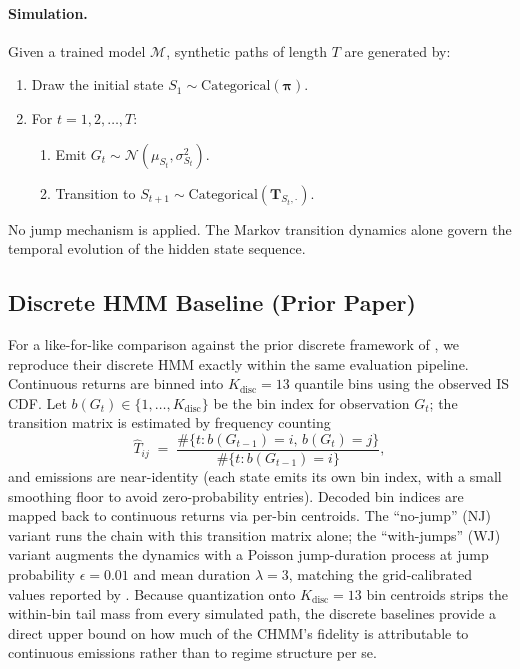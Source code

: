 \paragraph{Simulation.}
Given a trained model $\mathcal{M}$, synthetic paths of length $T$ are generated by:
\begin{enumerate}
    \item Draw the initial state $S_1 \sim \text{Categorical}(\boldsymbol{\pi})$.
    \item For $t = 1, 2, \ldots, T$:
    \begin{enumerate}
        \item Emit $G_t \sim \mathcal{N}(\mu_{S_t}, \sigma_{S_t}^2)$.
        \item Transition to $S_{t+1} \sim \text{Categorical}(\mathbf{T}_{S_t, \cdot})$.
    \end{enumerate}
\end{enumerate}
No jump mechanism is applied.
The Markov transition dynamics alone govern the temporal evolution of the hidden state sequence.

\subsection{Discrete HMM Baseline (Prior Paper)}
\label{sec:discrete_hmm}

For a like-for-like comparison against the prior discrete framework of \citet{alswaidan2026hybrid}, we reproduce their discrete HMM exactly within the same evaluation pipeline.
Continuous returns are binned into $K_{\text{disc}} = 13$ quantile bins using the observed IS CDF.
Let $b(G_t) \in \{1, \dots, K_{\text{disc}}\}$ be the bin index for observation $G_t$; the transition matrix is estimated by frequency counting
\begin{equation}
    \hat{T}_{ij} \;=\; \frac{\#\{t : b(G_{t-1}) = i,\, b(G_t) = j\}}{\#\{t : b(G_{t-1}) = i\}},
    \label{eq:disc_T}
\end{equation}
and emissions are near-identity (each state emits its own bin index, with a small smoothing floor to avoid zero-probability entries).
Decoded bin indices are mapped back to continuous returns via per-bin centroids.
The ``no-jump'' (NJ) variant runs the chain with this transition matrix alone; the ``with-jumps'' (WJ) variant augments the dynamics with a Poisson jump-duration process at jump probability $\epsilon = 0.01$ and mean duration $\lambda = 3$, matching the grid-calibrated values reported by \citet{alswaidan2026hybrid}.
Because quantization onto $K_{\text{disc}} = 13$ bin centroids strips the within-bin tail mass from every simulated path, the discrete baselines provide a direct upper bound on how much of the CHMM's fidelity is attributable to continuous emissions rather than to regime structure per se.

